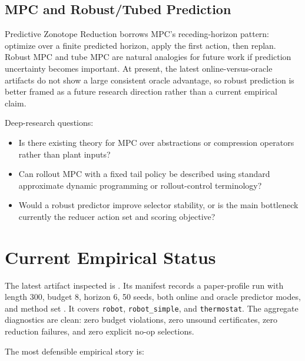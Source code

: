 \documentclass[11pt]{article}
\newcommand{\pzr}{Predictive Zonotope Reduction}
\begin{document}
\subsection{MPC and Robust/Tubed Prediction}

\pzr{} borrows MPC's receding-horizon pattern: optimize over a finite predicted
horizon, apply the first action, then replan. Robust MPC and tube MPC are
natural analogies for future work if prediction uncertainty becomes important.
At present, the latest online-versus-oracle artifacts do not show a large
consistent oracle advantage, so robust prediction is better framed as a future
research direction rather than a current empirical claim.

Deep-research questions:

\begin{itemize}
\item Is there existing theory for MPC over abstractions or compression
operators rather than plant inputs?
\item Can rollout MPC with a fixed tail policy be described using standard
approximate dynamic programming or rollout-control terminology?
\item Would a robust predictor improve selector stability, or is the main
bottleneck currently the reducer action set and scoring objective?
\end{itemize}

\section{Current Empirical Status}

The latest artifact inspected is . Its manifest
records a paper-profile run with length 300, budget 8, horizon 6, 50 seeds,
both online and oracle predictor modes, and method set
. It covers \texttt{robot}, \texttt{robot\_simple}, and
\texttt{thermostat}. The aggregate diagnostics are
clean: zero budget violations, zero unsound certificates, zero reduction
failures, and zero explicit no-op selections.

The most defensible empirical story is:
\end{document}
